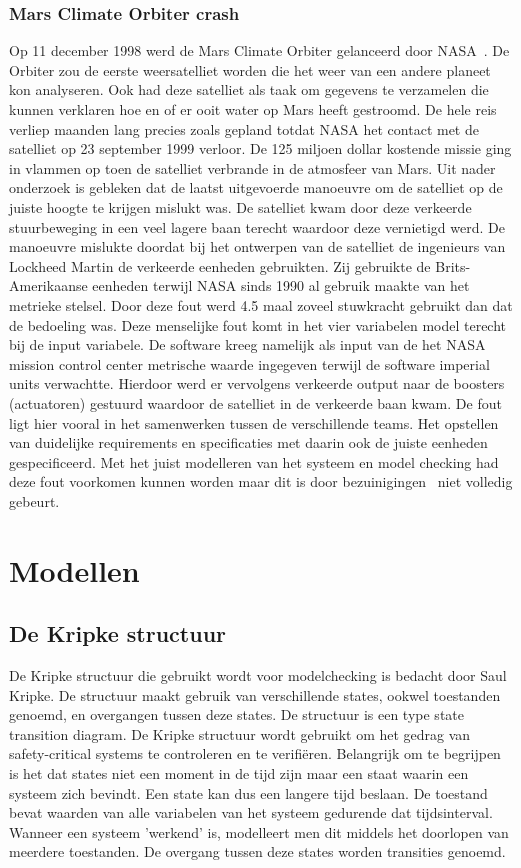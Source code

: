 \documentclass{article}
\begin{document}
\subsubsection{Mars Climate Orbiter crash}
Op 11 december 1998 werd de Mars Climate Orbiter gelanceerd door NASA~\cite{marsprobe}. De Orbiter zou de eerste weersatelliet worden die het weer van een andere planeet kon analyseren. Ook had deze satelliet als taak om gegevens te verzamelen die kunnen verklaren hoe en of er ooit water op Mars heeft gestroomd. De hele reis verliep maanden lang precies zoals gepland totdat NASA het contact met de satelliet op 23 september 1999 verloor. De 125 miljoen dollar kostende missie ging in vlammen op toen de satelliet verbrande in de atmosfeer van Mars. Uit nader onderzoek is gebleken dat de laatst uitgevoerde manoeuvre om de satelliet op de juiste hoogte te krijgen mislukt was. De satelliet kwam door deze verkeerde stuurbeweging in een veel lagere baan terecht waardoor deze vernietigd werd. De manoeuvre mislukte doordat bij het ontwerpen van de satelliet de ingenieurs van Lockheed Martin de verkeerde eenheden gebruikten. Zij gebruikte de Brits-Amerikaanse eenheden terwijl NASA sinds 1990 al gebruik maakte van het metrieke stelsel. Door deze fout werd 4.5 maal zoveel stuwkracht gebruikt dan dat de bedoeling was. Deze menselijke fout komt in het vier variabelen model terecht bij de input variabele. De software kreeg namelijk als input van de het NASA mission control center metrische waarde ingegeven terwijl de software imperial units verwachtte. Hierdoor werd er vervolgens verkeerde output naar de boosters (actuatoren) gestuurd waardoor de satelliet in de verkeerde baan kwam. De fout ligt hier vooral in het samenwerken tussen de verschillende teams. Het opstellen van duidelijke requirements en specificaties met daarin ook de juiste eenheden gespecificeerd. Met het juist modelleren van het systeem en model checking had deze fout voorkomen kunnen worden maar dit is door bezuinigingen~\cite{marsprobe} niet volledig gebeurt.

\section{Modellen}

\subsection{De Kripke structuur}
De Kripke structuur die gebruikt wordt voor modelchecking is bedacht door Saul Kripke. De structuur maakt gebruik van verschillende states, ookwel toestanden genoemd, en overgangen tussen deze states. De structuur is een type state transition diagram. De Kripke structuur wordt gebruikt om het gedrag van safety-critical systems te controleren en te verifiëren. Belangrijk om te begrijpen is het dat states niet een moment in de tijd zijn maar een staat waarin een systeem zich bevindt. Een state kan dus een langere tijd beslaan. De toestand bevat waarden van alle variabelen van het systeem gedurende dat tijdsinterval.
Wanneer een systeem 'werkend' is, modelleert men dit middels het doorlopen van meerdere toestanden. De overgang tussen deze states worden transities genoemd.
\end{document}
